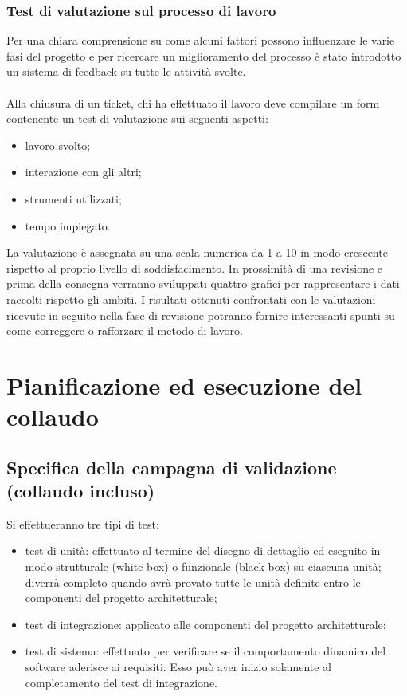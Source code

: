 \subsection{Test di valutazione sul processo di lavoro}
Per una chiara comprensione su come alcuni fattori possono influenzare le varie
fasi del progetto e per ricercare un miglioramento del processo \`e
stato introdotto un sistema di feedback su tutte le attivit\`a svolte.\\ \\
Alla chiusura di un ticket, chi ha effettuato il lavoro deve compilare un form
contenente un test di valutazione sui seguenti aspetti:

\begin{itemize}
\item lavoro svolto;
\item interazione con gli altri;
\item strumenti utilizzati;
\item tempo impiegato.
\end{itemize}

La valutazione \`e assegnata su una scala numerica da 1 a 10 in modo crescente
rispetto al proprio livello di soddisfacimento.
In prossimit\`a di una revisione e prima della consegna verranno sviluppati
quattro grafici per rappresentare i dati raccolti rispetto gli ambiti. 
I risultati ottenuti confrontati con le valutazioni ricevute in seguito nella
fase di revisione potranno fornire interessanti spunti su come correggere o
rafforzare il metodo di lavoro.





\chapter{Pianificazione ed esecuzione del \\collaudo}
\thispagestyle{fancy} %

\section{Specifica della campagna di validazione \\(collaudo incluso)}


Si effettueranno tre tipi di test:

\begin{itemize}
	\item test di unit\`a: effettuato al termine del disegno di dettaglio ed eseguito
in modo strutturale (white-box) o funzionale (black-box) su ciascuna unit\`a; diverr\`a completo quando avr\`a provato tutte le unit\`a definite entro le
componenti del progetto architetturale;
	\item test di integrazione: applicato alle componenti del progetto
architetturale;
	\item test di sistema: effettuato per verificare se il comportamento dinamico
del software aderisce ai requisiti. Esso pu\`o aver inizio solamente al
completamento del test di integrazione.
\end{itemize}

